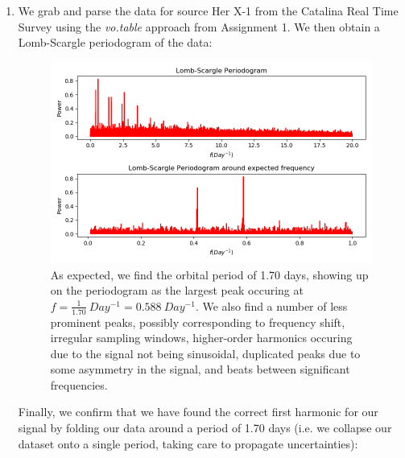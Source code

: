 \documentclass[11pt]{article}
\begin{document}
\begin{enumerate}
	\item We grab and parse the data for source Her X-1 from the Catalina Real Time Survey using the \textit{vo.table} approach from Assignment 1. We then obtain a Lomb-Scargle periodogram of the data:
	\begin{figure}[htp]
	\centering
	\includegraphics[scale=0.80]{her_x-1_lombscargle.png}
	\caption{As expected, we find the orbital period of 1.70 days, showing up on the periodogram as the largest peak occuring at $f=\frac{1}{1.70} \ Day^{-1} = 0.588 \ Day^{-1}$. We also find a number of less prominent peaks, possibly corresponding to frequency shift, irregular sampling windows, higher-order harmonics occuring due to the signal not being sinusoidal, duplicated peaks due to some asymmetry in the signal, and beats between significant frequencies.}
	\label{ls_herx1}
	\end{figure}
	
	Finally, we confirm that we have found the correct first harmonic for our signal by folding our data around a period of 1.70 days (i.e. we collapse our dataset onto a single period, taking care to propagate uncertainties):
	

\end{enumerate}
\end{document}
